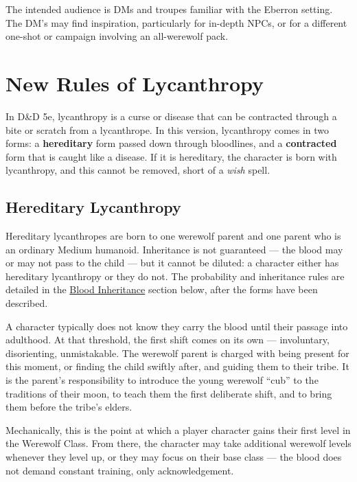 \documentclass[twocolumn]{dndbook}
\begin{document}
The intended audience is DMs and troupes familiar with the Eberron setting.
The DM's may find inspiration, particularly for in-depth NPCs, or for a different one-shot or campaign involving an all-werewolf pack.\par

\section*{New Rules of Lycanthropy}

In D\&D 5e, lycanthropy is a curse or disease that can be contracted through a bite or scratch from a lycanthrope.
In this version, lycanthropy comes in two forms: a \textbf{hereditary} form passed down through bloodlines, and a \textbf{contracted} form that is caught like a disease.
If it is hereditary, the character is born with lycanthropy, and this cannot be removed, short of a \emph{wish} spell.\par

\subsection*{Hereditary Lycanthropy}
Hereditary lycanthropes are born to one werewolf parent and one parent who is an ordinary Medium humanoid.
Inheritance is not guaranteed --- the blood may or may not pass to the child --- but it cannot be diluted: a character either has hereditary lycanthropy or they do not.
The probability and inheritance rules are detailed in the \hyperref[sec:blood-inheritance]{Blood Inheritance} section below, after the forms have been described.

A character typically does not know they carry the blood until their passage into adulthood.
At that threshold, the first shift comes on its own --- involuntary, disorienting, unmistakable.
The werewolf parent is charged with being present for this moment, or finding the child swiftly after, and guiding them to their tribe.
It is the parent's responsibility to introduce the young werewolf ``cub'' to the traditions of their moon, to teach them the first deliberate shift, and to bring them before the tribe's elders.\par

Mechanically, this is the point at which a player character gains their first level in the Werewolf Class.
From there, the character may take additional werewolf levels whenever they level up, or they may focus on their base class --- the blood does not demand constant training, only acknowledgement.\par
\end{document}
